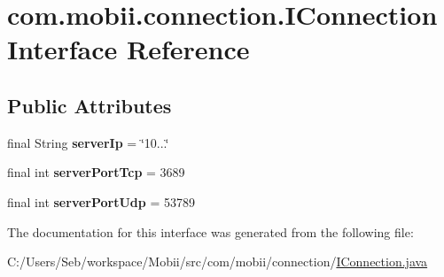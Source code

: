 \hypertarget{interfacecom_1_1mobii_1_1connection_1_1_i_connection}{\section{com.\-mobii.\-connection.\-I\-Connection Interface Reference}
\label{interfacecom_1_1mobii_1_1connection_1_1_i_connection}
}
\subsection*{Public Attributes}
\begin{DoxyCompactItemize}
\item 
\hypertarget{interfacecom_1_1mobii_1_1connection_1_1_i_connection_ab73d80baebdaeee623c68efcfe53d06d}{final String {\bfseries server\-Ip} = \char`\"{}10...\char`\"{}}\label{interfacecom_1_1mobii_1_1connection_1_1_i_connection_ab73d80baebdaeee623c68efcfe53d06d}

\item 
\hypertarget{interfacecom_1_1mobii_1_1connection_1_1_i_connection_ab5951770b401c82bf2cdd1ff0a0f30c2}{final int {\bfseries server\-Port\-Tcp} = 3689}\label{interfacecom_1_1mobii_1_1connection_1_1_i_connection_ab5951770b401c82bf2cdd1ff0a0f30c2}

\item 
\hypertarget{interfacecom_1_1mobii_1_1connection_1_1_i_connection_af775634a517e80c38b01d3faec841c75}{final int {\bfseries server\-Port\-Udp} = 53789}\label{interfacecom_1_1mobii_1_1connection_1_1_i_connection_af775634a517e80c38b01d3faec841c75}

\end{DoxyCompactItemize}


The documentation for this interface was generated from the following file\-:\begin{DoxyCompactItemize}
\item 
C\-:/\-Users/\-Seb/workspace/\-Mobii/src/com/mobii/connection/\hyperlink{_i_connection_8java}{I\-Connection.\-java}\end{DoxyCompactItemize}
